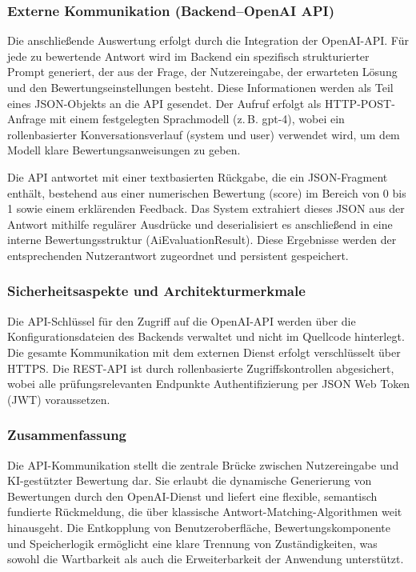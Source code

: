 \documentclass[a4paper,12pt]{article}
\begin{document}
\subsubsection{Externe Kommunikation (Backend–OpenAI API)}
Die anschließende Auswertung erfolgt durch die Integration der OpenAI-API. Für jede zu bewertende Antwort wird im Backend ein spezifisch strukturierter Prompt generiert, der aus der Frage, der Nutzereingabe, der erwarteten Lösung und den Bewertungseinstellungen besteht. Diese Informationen werden als Teil eines JSON-Objekts an die API gesendet. Der Aufruf erfolgt als HTTP-POST-Anfrage mit einem festgelegten Sprachmodell (z. B. gpt-4), wobei ein rollenbasierter Konversationsverlauf (system und user) verwendet wird, um dem Modell klare Bewertungsanweisungen zu geben.

Die API antwortet mit einer textbasierten Rückgabe, die ein JSON-Fragment enthält, bestehend aus einer numerischen Bewertung (score) im Bereich von 0 bis 1 sowie einem erklärenden Feedback. Das System extrahiert dieses JSON aus der Antwort mithilfe regulärer Ausdrücke und deserialisiert es anschließend in eine interne Bewertungsstruktur (AiEvaluationResult). Diese Ergebnisse werden der entsprechenden Nutzerantwort zugeordnet und persistent gespeichert.

\subsubsection{Sicherheitsaspekte und Architekturmerkmale}
Die API-Schlüssel für den Zugriff auf die OpenAI-API werden über die Konfigurationsdateien des Backends verwaltet und nicht im Quellcode hinterlegt. Die gesamte Kommunikation mit dem externen Dienst erfolgt verschlüsselt über HTTPS. Die REST-API ist durch rollenbasierte Zugriffskontrollen abgesichert, wobei alle prüfungsrelevanten Endpunkte Authentifizierung per JSON Web Token (JWT) voraussetzen.

\subsubsection{Zusammenfassung}
Die API-Kommunikation stellt die zentrale Brücke zwischen Nutzereingabe und KI-gestützter Bewertung dar. Sie erlaubt die dynamische Generierung von Bewertungen durch den OpenAI-Dienst und liefert eine flexible, semantisch fundierte Rückmeldung, die über klassische Antwort-Matching-Algorithmen weit hinausgeht. Die Entkopplung von Benutzeroberfläche, Bewertungskomponente und Speicherlogik ermöglicht eine klare Trennung von Zuständigkeiten, was sowohl die Wartbarkeit als auch die Erweiterbarkeit der Anwendung unterstützt.
\end{document}
